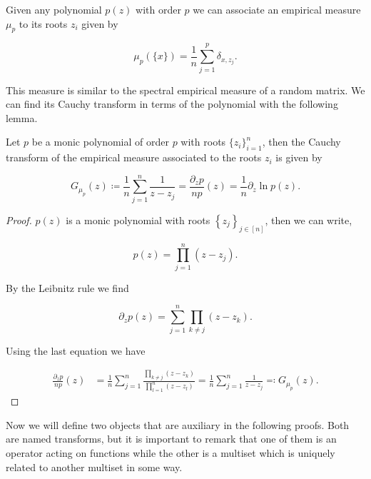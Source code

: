 Given any polynomial $p(z)$ with order $p$ we can associate an empirical measure $\mu_p$ to its roots $z_i$ given by

\begin{equation*}
    \mu_p(\{x\}) = \frac1n\sum_{j=1}^p \delta_{x,z_j}.
\end{equation*}

This measure is similar to the spectral empirical measure of a random matrix. We can find its Cauchy transform in terms of the polynomial with the following lemma.

\begin{lemma} \label{lemma:cauchy_empirical_polynomial}
    Let $p$ be a monic polynomial of order $p$ with roots $\{z_i\}_{i=1}^n$, then the Cauchy transform of the empirical measure associated to the roots $z_i$ is given by 

    \begin{equation*}
        G_{\mu_p}(z) \coloneqq \frac1n \sum_{j=1}^n \frac1{z - z_j} = \frac{\partial_z p }{n p}(z) = \frac1n \partial_z \ln p(z).
    \end{equation*}

\end{lemma}

\begin{proof}
    $p(z)$ is a monic polynomial with roots $\left\{ z_j \right\}_{j \in [n]}$, then we can write,

    \begin{equation*}
        p(z) = \prod_{j=1}^n (z-z_j).
    \end{equation*}

    By the Leibnitz rule we find

    \begin{equation*}
        \partial_z p(z) = \sum_{j=1}^n \prod_{k\neq j} (z-z_k).
    \end{equation*}

    Using the last equation we have

    \begin{align*}
        \frac{\partial_z p}{n p}(z) &= \frac1n\sum_{j=1}^n \frac{\prod_{k\neq j} (z-z_k) }{ \prod_{l=1}^n (z-z_l) } = \frac1n\sum_{j=1}^n \frac{1}{z - z_j} \eqqcolon G_{\mu_p}(z).
    \end{align*}
\end{proof}

Now we will define two objects that are auxiliary in the following proofs. Both are named transforms, but it is important to remark that one of them is an operator acting on functions while the other is a multiset which is uniquely related to another multiset in some way.

